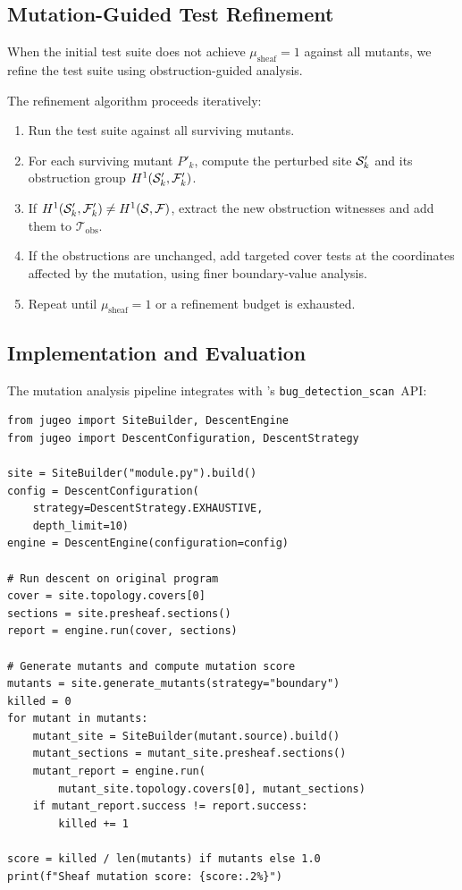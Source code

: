 \documentclass[11pt]{article}
\newcommand{\BugScan}{\texttt{bug\_detection\_scan}}
\newcommand{\ObstrSuite}{\mathcal{T}_{\mathrm{obs}}}
\begin{document}
\subsection{Mutation-Guided Test Refinement}\label{sec:mutation-refinement}

When the initial test suite does not achieve $\mu_{\mathrm{sheaf}} = 1$
against all mutants, we refine the test suite using obstruction-guided
analysis.

The refinement algorithm proceeds iteratively:
\begin{enumerate}[noitemsep]
  \item Run the test suite against all surviving mutants.
  \item For each surviving mutant $P'_k$, compute the perturbed site
        $\mathcal{S}'_k$ and its obstruction group $H^{1}(\mathcal{S}'_k,
        \mathcal{F}'_k)$.
  \item If $H^{1}(\mathcal{S}'_k, \mathcal{F}'_k) \neq
        H^{1}(\mathcal{S}, \mathcal{F})$, extract the new obstruction
        witnesses and add them to $\ObstrSuite$.
  \item If the obstructions are unchanged, add targeted cover tests
        at the coordinates affected by the mutation, using finer
        boundary-value analysis.
  \item Repeat until $\mu_{\mathrm{sheaf}} = 1$ or a refinement
        budget is exhausted.
\end{enumerate}

\subsection{Implementation and Evaluation}

The mutation analysis pipeline integrates with \JuGeo's \BugScan\ API:

\begin{lstlisting}[style=jugeo-python]
from jugeo import SiteBuilder, DescentEngine
from jugeo import DescentConfiguration, DescentStrategy

site = SiteBuilder("module.py").build()
config = DescentConfiguration(
    strategy=DescentStrategy.EXHAUSTIVE,
    depth_limit=10)
engine = DescentEngine(configuration=config)

# Run descent on original program
cover = site.topology.covers[0]
sections = site.presheaf.sections()
report = engine.run(cover, sections)

# Generate mutants and compute mutation score
mutants = site.generate_mutants(strategy="boundary")
killed = 0
for mutant in mutants:
    mutant_site = SiteBuilder(mutant.source).build()
    mutant_sections = mutant_site.presheaf.sections()
    mutant_report = engine.run(
        mutant_site.topology.covers[0], mutant_sections)
    if mutant_report.success != report.success:
        killed += 1

score = killed / len(mutants) if mutants else 1.0
print(f"Sheaf mutation score: {score:.2%}")
\end{lstlisting}
\end{document}
